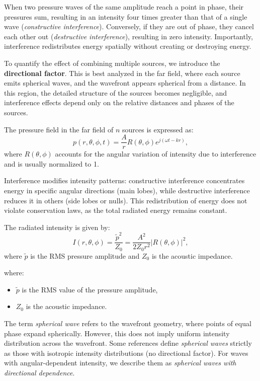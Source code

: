 \documentclass[a4paper]{article}
\begin{document}
When two pressure waves of the same amplitude reach a point in phase, their pressures sum, resulting in an intensity four times greater than that of a single wave (\textit{constructive interference}). Conversely, if they are out of phase, they cancel each other out (\textit{destructive interference}), resulting in zero intensity. Importantly, interference redistributes energy spatially without creating or destroying energy. 







To quantify the effect of combining multiple sources, we introduce the \textbf{directional factor}. This is best analyzed in the far field, where each source emits spherical waves, and the wavefront appears spherical from a distance. In this region, the detailed structure of the sources becomes negligible, and interference effects depend only on the relative distances and phases of the sources.

The pressure field in the far field of \( n \) sources is expressed as:
\[
p(r, \theta, \phi, t) = \frac{A}{r} R(\theta, \phi) e^{j(\omega t - kr)},
\]
where \( R(\theta, \phi) \) accounts for the angular variation of intensity due to interference and is usually normalized to 1.

Interference modifies intensity patterns: constructive interference concentrates energy in specific angular directions (main lobes), while destructive interference reduces it in others (side lobes or nulls). This redistribution of energy does not violate conservation laws, as the total radiated energy remains constant.

The radiated intensity is given by:
\[
I(r, \theta, \phi) = \frac{\tilde{p}^2}{Z_0} = \frac{A^2}{2 Z_0 r^2} |R(\theta, \phi)|^2,
\]
where \( \tilde{p} \) is the RMS pressure amplitude and \( Z_0 \) is the acoustic impedance.

where:
\begin{itemize}
    \item \( \tilde{p} \) is the RMS value of the pressure amplitude,
    \item \( Z_0 \) is the acoustic impedance.
\end{itemize}



The term \textit{spherical wave} refers to the wavefront geometry, where points of equal phase expand spherically. However, this does not imply uniform intensity distribution across the wavefront. Some references define \textit{spherical waves} strictly as those with isotropic intensity distributions (no directional factor). For waves with angular-dependent intensity, we describe them as \textit{spherical waves with directional dependence}.
\end{document}
